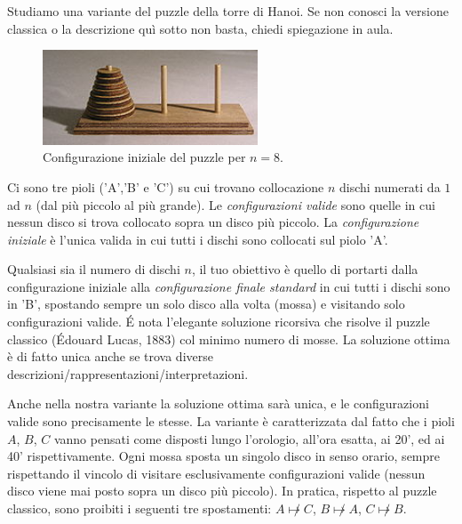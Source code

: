 \renewcommand{\nomebreve}{hanoi\_clockwise}
\renewcommand{\titolo}{The Hanoi puzzle with only clockwise moves}

\introduzione{}

Studiamo una variante del puzzle della torre di Hanoi. Se non conosci la versione classica o la descrizione quì sotto non basta, chiedi spiegazione in aula.

\begin{figure}[h!]
\begin{center}
  \noindent \includegraphics[width=0.57\textwidth]{figures/220px-Tower_of_Hanoi.jpeg}
\end{center}
\caption{Configurazione iniziale del puzzle per $n=8$.}
\end{figure}

Ci sono tre pioli ('A','B' e 'C') su cui trovano collocazione $n$ dischi numerati da $1$ ad $n$ (dal più piccolo al più grande). Le \emph{configurazioni valide} sono quelle in cui nessun disco si trova collocato sopra un disco più piccolo.
La \emph{configurazione iniziale} è l'unica valida in cui tutti i dischi sono collocati sul piolo 'A'.


Qualsiasi sia il numero di dischi $n$, il tuo obiettivo è quello di portarti dalla configurazione iniziale alla \emph{configurazione finale standard} in cui tutti i dischi sono in 'B', spostando sempre un solo disco alla volta (mossa) e visitando solo configurazioni valide.
\'E nota l'elegante soluzione ricorsiva che risolve il puzzle classico (Édouard Lucas, 1883) col minimo numero di mosse. La soluzione ottima è di fatto unica anche se trova diverse descrizioni/rappresentazioni/interpretazioni.

Anche nella nostra variante la soluzione ottima sarà unica, e le configurazioni valide sono precisamente le stesse. La variante è caratterizzata dal fatto che i pioli $A$, $B$, $C$ vanno pensati come disposti lungo l'orologio, all'ora esatta, ai 20', ed ai 40' rispettivamente.
Ogni mossa sposta un singolo disco in senso orario, sempre rispettando il vincolo di visitare esclusivamente configurazioni valide (nessun disco viene mai posto sopra un disco più piccolo). In pratica, rispetto al puzzle classico, sono proibiti i seguenti tre spostamenti: $A\not \mapsto C$, $B\not \mapsto A$, $C\not \mapsto B$.\\

